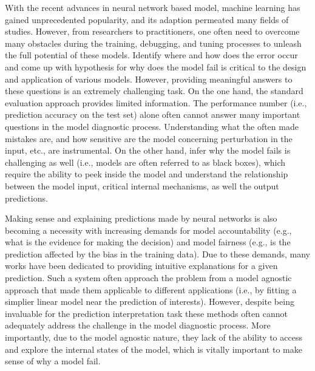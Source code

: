 \maketitle

With the recent advances in neural network based model, machine learning has
gained unprecedented popularity, and its adaption permeated many fields of studies.
%
However, from researchers to practitioners, one often need to overcome many
obstacles during the training, debugging, and tuning processes to unleash
the full potential of these models.
%
Identify where and how does the error occur and come up with hypothesis for
why does the model fail is critical to the design and application of various models.
However, providing meaningful answers to these questions is an extremely challenging task.
On the one hand, the standard evaluation approach provides limited information. The performance number (i.e., prediction accuracy on the test set) alone often cannot answer many important questions in the model diagnostic process. Understanding what the often made mistakes are, and how sensitive are the model concerning perturbation in the input, etc., are instrumental. On the other hand, infer why the model fails is challenging as well (i.e., models are often referred to as black boxes),
which require the ability to peek inside the model and understand the relationship between the
model input, critical internal mechanisms, as well the output predictions.

Making sense and explaining predictions made by neural networks is also becoming a necessity with increasing demands for model accountability (e.g., what is the evidence for making the decision) and model fairness (e.g., is the prediction affected by the bias in the training data).
%
Due to these demands, many works have been dedicated to providing intuitive explanations for a given prediction. Such a system often approach the problem from a model agnostic approach that made them applicable to different applications (i.e., by fitting a simplier linear model near the prediction of interests).
%
However, despite being invaluable for the prediction interpretation task these methods often cannot adequately address the challenge in the model diagnostic process. More importantly, due to the model agnostic nature, they lack of the ability to access and explore the internal states of the model, which is vitally important to make sense of why a model fail.


